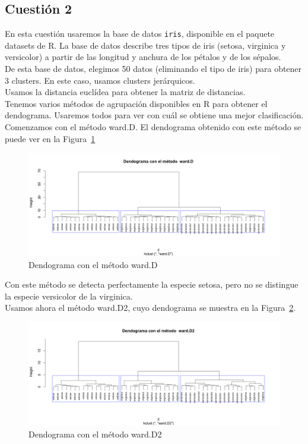 \documentclass[12pt,a4paper,twoside,openright,titlepage,final]{article}
\begin{document}
\subsection{Cuestión 2}

En esta cuestión usaremos la base de datos \texttt{iris}, disponible en el paquete datasets de R. La base de datos describe tres tipos de iris (setosa, virginica y versicolor) a partir de las longitud y anchura de los pétalos y de los sépalos.\\

De esta base de datos, elegimos 50 datos (eliminando el tipo de iris) para obtener 3 clusters. En este caso, usamos clusters jerárquicos.\\

Usamos la distancia euclídea para obtener la matriz de distancias.\\

Tenemos varios métodos de agrupación disponibles en R para obtener el dendograma. Usaremos todos para ver con cuál se obtiene una mejor clasificación.\\

Comenzamos con el método ward.D. El dendograma obtenido con este método se puede ver en la Figura~\ref{fig:dendograma_ward.D}\\

\begin{figure}[tbph!]
\centering
\includegraphics[width=0.9\linewidth]{imagenes/dendograma_wardD}
\caption{Dendograma con el método ward.D}
\label{fig:dendograma_ward.D}
\end{figure}

Con este método se detecta perfectamente la especie setosa, pero no se distingue la especie versicolor de la virginica.\\

Usamos ahora el método ward.D2, cuyo dendograma se muestra en la Figura~\ref{fig:dendograma_ward.D2}.\\

\begin{figure}[tbph!]
\centering
\includegraphics[width=0.9\linewidth]{imagenes/dendograma_wardD2}
\caption{Dendograma con el método ward.D2}
\label{fig:dendograma_ward.D2}
\end{figure}
\end{document}
